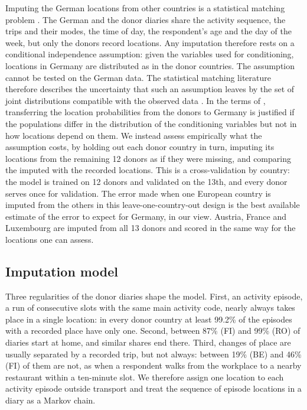 \documentclass[a4paper]{article}
\begin{document}
Imputing the German locations from other countries is a statistical matching problem \parencite{dorazioStatisticalMatchingTheory2006}. The German and the donor diaries share the activity sequence, the trips and their modes, the time of day, the respondent's age and the day of the week, but only the donors record locations. Any imputation therefore rests on a conditional independence assumption: given the variables used for conditioning, locations in Germany are distributed as in the donor countries. The assumption cannot be tested on the German data. The statistical matching literature therefore describes the uncertainty that such an assumption leaves by the set of joint distributions compatible with the observed data \parencite{rasslerStatisticalMatchingFrequentist2002,contiUncertaintyAnalysisStatistical2012,contiStatisticalMatchingAnalysis2016}. In the terms of \textcite{pearlExternalValidityDoCalculus2014}, transferring the location probabilities from the donors to Germany is justified if the populations differ in the distribution of the conditioning variables but not in how locations depend on them. We instead assess empirically what the assumption costs, by holding out each donor country in turn, imputing its locations from the remaining 12 donors as if they were missing, and comparing the imputed with the recorded locations. This is a cross-validation by country: the model is trained on 12 donors and validated on the 13th, and every donor serves once for validation. The error made when one European country is imputed from the others in this leave-one-country-out design is the best available estimate of the error to expect for Germany, in our view. Austria, France and Luxembourg are imputed from all 13 donors and scored in the same way for the locations one can assess.

\subsection{Imputation model}
\label{sec:model}

Three regularities of the donor diaries shape the model. First, an activity episode, a run of consecutive slots with the same main activity code, nearly always takes place in a single location: in every donor country at least 99.2\% of the episodes with a recorded place have only one. Second, between 87\% (FI) and 99\% (RO) of diaries start at home, and similar shares end there. Third, changes of place are usually separated by a recorded trip, but not always: between 19\% (BE) and 46\% (FI) of them are not, as when a respondent walks from the workplace to a nearby restaurant within a ten-minute slot. We therefore assign one location to each activity episode outside transport and treat the sequence of episode locations in a diary as a Markov chain.
\end{document}
